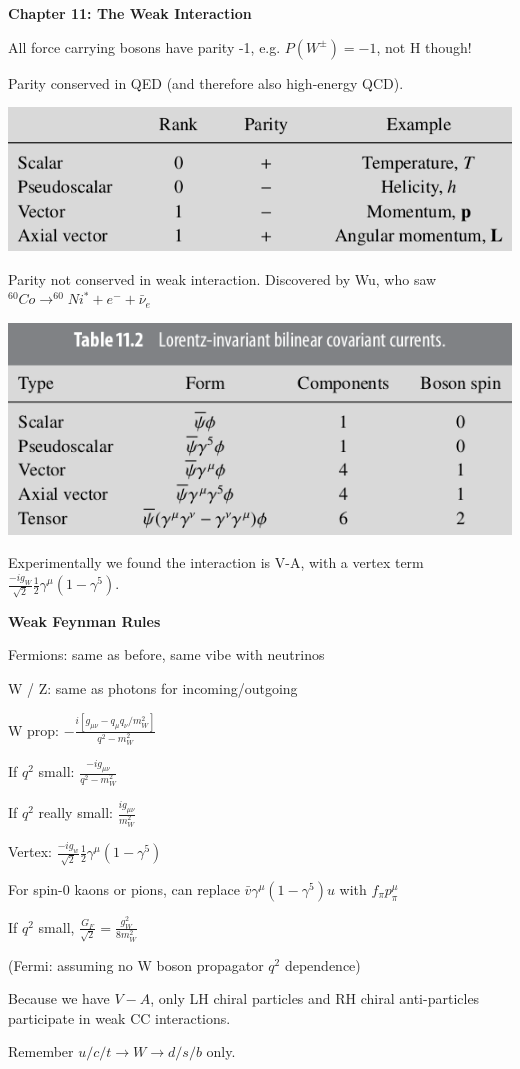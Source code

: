 \textbf{Chapter 11: The Weak Interaction}

All force carrying bosons have parity -1, e.g. $P(W^\pm) = -1$, not H though!

Parity conserved in QED (and therefore also high-energy QCD).

\begin{center}
    \includegraphics[width=\linewidth]{images/V-A.png}
\end{center}

Parity not conserved in weak interaction. Discovered by Wu, who saw $^{60}Co \to ^{60}Ni^* + e^- + \bar{\nu}_e$

\begin{center}
    \includegraphics[width=\linewidth]{images/bilinear_covariant_currents.png}
\end{center}

Experimentally we found the interaction is V-A, with a vertex term $\frac{-ig_W}{\sqrt{2}}\frac{1}{2}\gamma^\mu(1 - \gamma^5)$.

\textbf{Weak Feynman Rules}

Fermions: same as before, same vibe with neutrinos

W / Z: same as photons for incoming/outgoing

W prop: $-\frac{i[g_{\mu\nu} - q_\mu q_\nu / m_W^2]}{q^2 - m_W^2}$

If $q^2$ small: $\frac{-ig_{\mu\nu}}{q^2 - m_W^2}$

If $q^2$ really small: $\frac{ig_{\mu\nu}}{m_W^2}$

Vertex: $\frac{-ig_w}{\sqrt{2}}\frac{1}{2}\gamma^\mu (1 - \gamma^5)$

For spin-0 kaons or pions, can replace $\bar{v}\gamma^\mu (1 - \gamma^5)u$ with $f_\pi p_\pi^\mu$

If $q^2$ small, $\frac{G_F}{\sqrt{2}} = \frac{g_W^2}{8m_W^2}$

(Fermi: assuming no W boson propagator $q^2$ dependence)

Because we have $V-A$, only LH chiral particles and RH chiral anti-particles participate in weak CC interactions.

Remember $u/c/t \to W \to d/s/b$ only.

